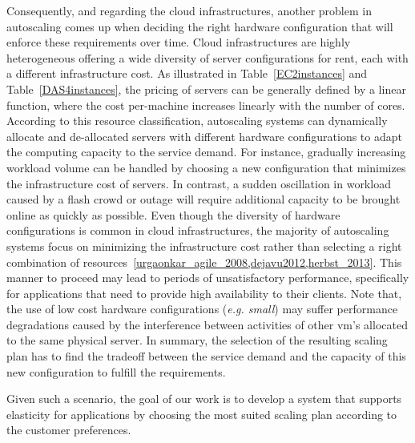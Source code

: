 Consequently, and regarding the cloud infrastructures, another problem in autoscaling comes up when deciding the right hardware configuration that will enforce these requirements over time. Cloud infrastructures are highly heterogeneous offering a wide diversity of server configurations for rent, each with a different infrastructure cost. As illustrated in Table~\ref{EC2instances} and Table~\ref{DAS4instances}, the pricing of servers can be generally defined by a linear function, where the cost per-machine increases linearly with the number of cores. According to this resource classification, autoscaling systems can dynamically allocate and de-allocated servers with different hardware configurations to adapt the computing capacity to the service demand. For instance, gradually increasing workload volume can be handled by choosing a new configuration that minimizes the infrastructure cost of servers. In contrast, a sudden oscillation in workload caused by a flash crowd or outage will require additional capacity to be brought online as quickly as possible. Even though the diversity of hardware configurations is common in cloud infrastructures, the majority of autoscaling systems focus on minimizing the infrastructure cost rather than selecting a right combination of resources~\ref{urgaonkar_agile_2008,dejavu2012,herbst_2013}. This manner to proceed may lead to periods of unsatisfactory performance, specifically for applications that need to provide high availability to their clients. Note that, the use of low cost hardware configurations (\emph{e.g. small}) may suffer performance degradations caused by the interference between activities of other vm's allocated to the same physical server. In summary, the selection of the resulting scaling plan has to find the tradeoff between the service demand and the capacity of this new configuration to fulfill the requirements.

Given such a scenario, the goal of our work is to develop a system that supports elasticity for applications by choosing the most suited scaling plan according to the customer preferences.















